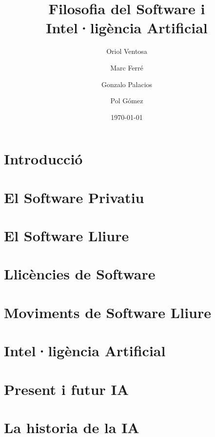 \documentclass[a4paper,12pt]{report}
\begin{document}
\title{
	{\bf Filosofia del Software i Intel·ligència Artificial}
}
\author{
	Oriol Ventosa \and
	Marc Ferré \and
	Gonzalo Palacios \and
	Pol Gómez
}
\date{\today}
\maketitle

\tableofcontents

\chapter{Introducció}


\chapter{El Software Privatiu}


\chapter{El Software Lliure}


\chapter{Llicències de Software}


\chapter{Moviments de Software Lliure}


\chapter{Intel·ligència Artificial}


\chapter{Present i futur IA}


\chapter{La historia de la IA}




\end{document}
